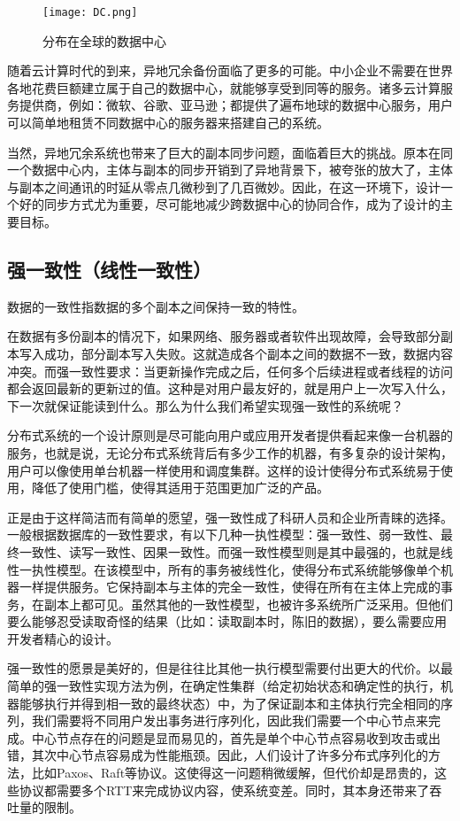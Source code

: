  \begin{figure}[htb]
  \centering
  \texttt{[image: DC.png]}
  \caption{分布在全球的数据中心}
  \label{fig:badge}
\end{figure}

  随着云计算时代的到来，异地冗余备份面临了更多的可能。中小企业不需要在世界各地花费巨额建立属于自己的数据中心，就能够享受到同等的服务。诸多云计算服务提供商，例如：微软、谷歌、亚马逊；都提供了遍布地球的数据中心服务，用户可以简单地租赁不同数据中心的服务器来搭建自己的系统。
  
  当然，异地冗余系统也带来了巨大的副本同步问题，面临着巨大的挑战。原本在同一个数据中心内，主体与副本的同步开销到了异地背景下，被夸张的放大了，主体与副本之间通讯的时延从零点几微秒到了几百微妙。因此，在这一环境下，设计一个好的同步方式尤为重要，尽可能地减少跨数据中心的协同合作，成为了设计的主要目标。


\subsection{强一致性（线性一致性）}
 数据的一致性指数据的多个副本之间保持一致的特性。

 在数据有多份副本的情况下，如果网络、服务器或者软件出现故障，会导致部分副本写入成功，部分副本写入失败。这就造成各个副本之间的数据不一致，数据内容冲突。而强一致性要求：当更新操作完成之后，任何多个后续进程或者线程的访问都会返回最新的更新过的值。这种是对用户最友好的，就是用户上一次写入什么，下一次就保证能读到什么。那么为什么我们希望实现强一致性的系统呢？

 分布式系统的一个设计原则是尽可能向用户或应用开发者提供看起来像一台机器的服务，也就是说，无论分布式系统背后有多少工作的机器，有多复杂的设计架构，用户可以像使用单台机器一样使用和调度集群。这样的设计使得分布式系统易于使用，降低了使用门槛，使得其适用于范围更加广泛的产品。

 正是由于这样简洁而有简单的愿望，强一致性成了科研人员和企业所青睐的选择。一般根据数据库的一致性要求，有以下几种一执性模型：强一致性、弱一致性、最终一致性、读写一致性、因果一致性。而强一致性模型则是其中最强的，也就是线性一执性模型。在该模型中，所有的事务被线性化，使得分布式系统能够像单个机器一样提供服务。它保持副本与主体的完全一致性，使得在所有在主体上完成的事务，在副本上都可见。虽然其他的一致性模型，也被许多系统所广泛采用。但他们要么能够忍受读取奇怪的结果（比如：读取副本时，陈旧的数据），要么需要应用开发者精心的设计。

 强一致性的愿景是美好的，但是往往比其他一执行模型需要付出更大的代价。以最简单的强一致性实现方法为例，在确定性集群（给定初始状态和确定性的执行，机器能够执行并得到相一致的最终状态）中，为了保证副本和主体执行完全相同的序列，我们需要将不同用户发出事务进行序列化，因此我们需要一个中心节点来完成。中心节点存在的问题是显而易见的，首先是单个中心节点容易收到攻击或出错，其次中心节点容易成为性能瓶颈。因此，人们设计了许多分布式序列化的方法，比如Paxos、Raft等协议。这使得这一问题稍微缓解，但代价却是昂贵的，这些协议都需要多个RTT来完成协议内容，使系统变差。同时，其本身还带来了吞吐量的限制。

